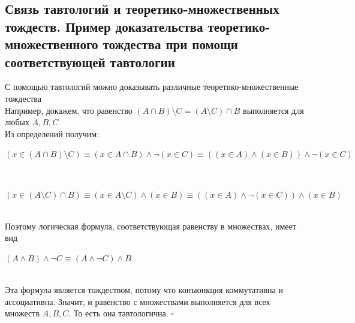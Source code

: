 \documentclass[a4paper]{article}
\newcommand{\qed}{\hfill$\square$}
\begin{document}
\subsection{Связь тавтологий и теоретико-множественных тождеств. Пример доказательства теоретико-множественного тождества при помощи соответствующей тавтологии}
\label{sec:2.2}С помощью тавтологий можно доказывать различные теоретико-множественные тождества\\[2mm]
Например, докажем, что равенство $(A\cap B)\setminus C=(A\setminus C)\cap B$ выполняется для любых $A, B, C$\\[2mm]
Из определений получим:\\[2mm]
\centerline{$(x\in(A\cap B)\setminus C)\equiv (x\in A\cap B)\wedge\neg(x\in C)\equiv((x\in A)\wedge(x\in B))\wedge\neg(x\in C)$}\\[2mm]
\centerline{$(x\in (A\setminus C)\cap B)\equiv(x\in A\setminus C)\wedge(x\in B)\equiv((x\in A)\wedge\neg(x\in C))\wedge(x\in B)$}\\[2mm]
Поэтому логическая формула, соответствующая равенству в множествах, имеет вид\\[2mm]
\centerline{$(A\wedge B)\wedge\neg C\equiv(A\wedge\neg C)\wedge B$}\\[2mm]
Эта формула является тождеством, потому что конъюнкция коммутативна и ассоциативна. Значит, и равенство с множествами выполняется для всех множеств $A, B, C$. То есть она тавтологична. \qed
\end{document}

